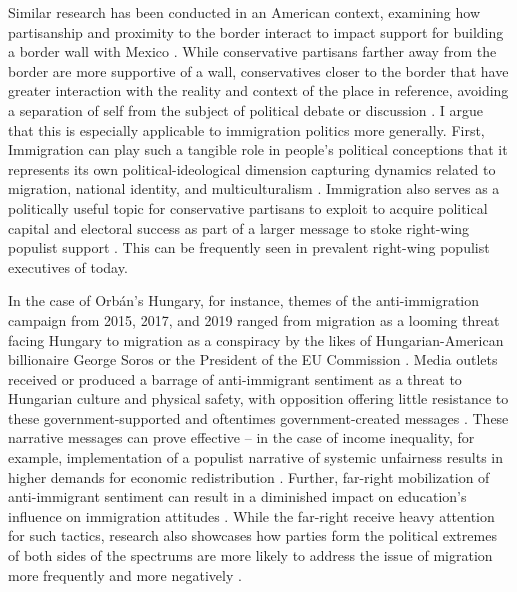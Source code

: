 \documentclass[12pt,]{article}
\begin{document}
Similar research has been conducted in an American context, examining
how partisanship and proximity to the border interact to impact support
for building a border wall with Mexico \citep{cortina2020}. While
conservative partisans farther away from the border are more supportive
of a wall, conservatives closer to the border that have greater
interaction with the reality and context of the place in reference,
avoiding a separation of self from the subject of political debate or
discussion \citep{cortina2020}. I argue that this is especially
applicable to immigration politics more generally. First, Immigration
can play such a tangible role in people's political conceptions that it
represents its own political-ideological dimension capturing dynamics
related to migration, national identity, and multiculturalism
\citep{ogrady2019}. Immigration also serves as a politically useful
topic for conservative partisans to exploit to acquire political capital
and electoral success as part of a larger message to stoke right-wing
populist support \citep{dipiazza2023, kamenova2017}. This can be
frequently seen in prevalent right-wing populist executives of today.

In the case of Orbán's Hungary, for instance, themes of the
anti-immigration campaign from 2015, 2017, and 2019 ranged from
migration as a looming threat facing Hungary to migration as a
conspiracy by the likes of Hungarian-American billionaire George Soros
or the President of the EU Commission \citep{bajomi-lazar2019}. Media
outlets received or produced a barrage of anti-immigrant sentiment as a
threat to Hungarian culture and physical safety, with opposition
offering little resistance to these government-supported and oftentimes
government-created messages \citep{bajomi-lazar2019}. These narrative
messages can prove effective -- in the case of income inequality, for
example, implementation of a populist narrative of systemic unfairness
results in higher demands for economic redistribution
\citep{culpepper2024}. Further, far-right mobilization of anti-immigrant
sentiment can result in a diminished impact on education's influence on
immigration attitudes \citep{mclaren2020}. While the far-right receive
heavy attention for such tactics, research also showcases how parties
form the political extremes of both sides of the spectrums are more
likely to address the issue of migration more frequently and more
negatively \citep{heidenreich2020}.
\end{document}
